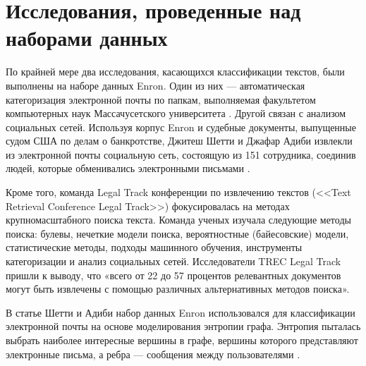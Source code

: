 \section{Исследования, проведенные над наборами данных}

По крайней мере два исследования, касающихся классификации текстов, были выполнены на наборе данных Enron. Один из них --- автоматическая категоризация электронной почты по папкам, выполняемая факультетом компьютерных наук Массачусетского университета \cite{bib_5}. Другой связан с анализом социальных сетей. Используя корпус Enron и судебные документы, выпущенные судом США по делам о банкротстве, Джитеш Шетти и Джафар Адиби извлекли из электронной почты социальную сеть, состоящую из 151 сотрудника, соединив людей, которые обменивались электронными письмами \cite{bib_6}.

Кроме того, команда Legal Track конференции по извлечению текстов (<<Text Retrieval Conference Legal Track>>) фокусировалась на методах крупномасштабного поиска текста. Команда ученых изучала следующие методы поиска: булевы, нечеткие модели поиска, вероятностные (байесовские) модели, статистические методы, подходы машинного обучения, инструменты категоризации и анализ социальных сетей. Исследователи TREC Legal Track пришли к выводу, что «всего от 22 до 57 процентов релевантных документов могут быть извлечены с помощью различных альтернативных методов поиска».

В статье Шетти и Адиби набор данных Enron использовался для классификации электронной почты на основе моделирования энтропии графа. Энтропия пыталась выбрать наиболее интересные вершины в графе, вершины которого представляют электронные письма, а ребра --- сообщения между пользователями \cite{bib_7}.
